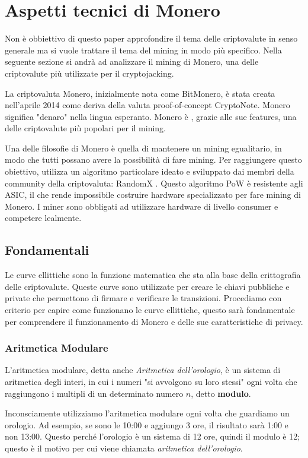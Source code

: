 \documentclass[12pt,a4paper]{article}
\begin{document}
\newpage 

\section{Aspetti tecnici di Monero}\label{sec:aspetti_tecnici} Non è obbiettivo
di questo paper approfondire il tema delle criptovalute in senso generale ma si
vuole trattare il tema del mining in modo più specifico. Nella seguente sezione
si andrà ad analizzare il mining di Monero, una delle criptovalute più
utilizzate per il cryptojacking.

La criptovaluta Monero, inizialmente nota come BitMonero, è stata creata
nell'aprile 2014 come deriva della valuta proof-of-concept CryptoNote. Monero
significa "denaro" nella lingua esperanto. Monero è , grazie alle sue features,
una delle criptovalute più popolari per il mining.

Una delle filosofie di Monero è quella di mantenere un mining egualitario, in
modo che tutti possano avere la possibilità di fare mining. Per raggiungere
questo obiettivo, utilizza un algoritmo particolare ideato e sviluppato dai
membri della community della criptovaluta: RandomX . Questo algoritmo PoW è
resistente agli ASIC, il che rende impossibile costruire hardware specializzato
per fare mining di Monero. I miner sono obbligati ad utilizzare hardware di
livello consumer e competere lealmente.

\subsection{Fondamentali}
Le curve ellittiche sono la funzione matematica che sta alla base della
crittografia delle criptovalute. Queste curve sono utilizzate per creare le
chiavi pubbliche e private che permettono di firmare e verificare le
transizioni. Procediamo con criterio per capire come funzionano le curve
ellittiche, questo sarà fondamentale per comprendere il funzionamento di Monero
e delle sue caratteristiche di privacy.

\subsubsection{Aritmetica Modulare}
L'aritmetica modulare, detta anche \textit{Aritmetica dell'orologio}, è un
sistema di aritmetica degli interi, in cui i numeri "si avvolgono su loro
stessi" ogni volta che raggiungono i multipli di un determinato numero $ n $,
detto \textbf{modulo}.

Inconsciamente utilizziamo l'aritmetica modulare ogni volta che guardiamo un
orologio. Ad esempio, se sono le 10:00 e aggiungo 3 ore, il risultato sarà 1:00
e non 13:00. Questo perché l'orologio è un sistema di 12 ore, quindi il modulo è
12; questo è il motivo per cui viene chiamata \textit{aritmetica dell'orologio}.
\end{document}
